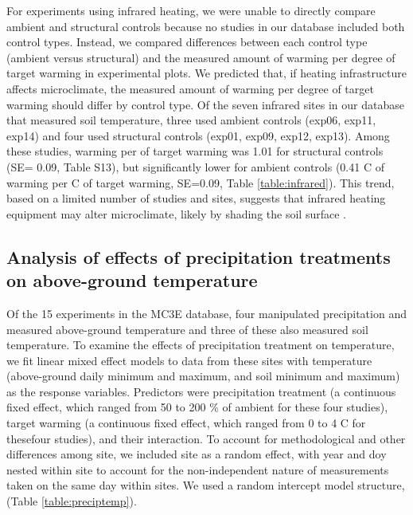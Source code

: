 \documentclass{article}
\begin{document}
\par For experiments using infrared heating, we were unable to directly compare ambient and structural controls because no studies in our database included both control types. Instead, we compared differences between each control type (ambient versus structural) and the measured amount of warming per degree of target warming in experimental plots. We predicted that, if heating infrastructure affects microclimate, the measured amount of warming per degree of target warming should differ by control type. Of the seven infrared sites in our database that measured soil temperature, three used ambient controls (exp06, exp11, exp14) and four used structural controls (exp01, exp09, exp12, exp13).  Among these studies, warming per \degree of target warming was 1.01 for structural controls (SE= 0.09, Table S13), but significantly lower for ambient controls (0.41 \degree C of warming per \degree C of target warming, SE=0.09, Table \ref{table:infrared}). This trend, based on a limited number of studies and sites, suggests that infrared heating equipment may alter microclimate, likely by shading the soil surface \citep{mcdaniel2014}.  

\subsection* {Analysis of effects of precipitation treatments on above-ground temperature}
Of the 15 experiments in the MC3E database, four manipulated precipitation and measured above-ground temperature and three of these also measured soil temperature. To examine the effects of precipitation treatment on temperature, we fit linear mixed effect models to data from these sites with temperature (above-ground daily minimum and maximum, and soil minimum and maximum) as the response variables. Predictors were precipitation treatment (a continuous fixed effect, which ranged from 50 to 200 \% of ambient for these four studies), target warming (a continuous fixed effect, which ranged from 0 to 4 \degree C for thesefour studies), and their interaction. To account for methodological and other differences among site, we included site as a random effect, with year and doy nested within site to account for the non-independent nature of measurements taken on the same day within sites. We used a random intercept model structure, (Table \ref{table:preciptemp}). 
\end{document}
